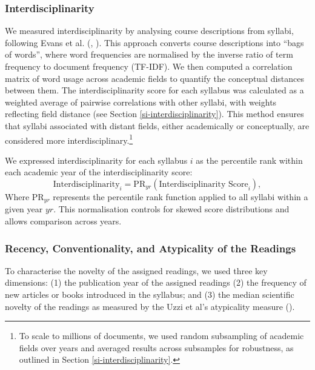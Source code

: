 \documentclass[
  11pt,
]{article}
\begin{document}
\subsubsection{Interdisciplinarity}\label{interdisciplinarity}

We measured interdisciplinarity by analysing course descriptions from syllabi, following Evans et al. (, ). This approach converts course descriptions into ``bags of words'', where word frequencies are normalised by the inverse ratio of term frequency to document frequency (TF-IDF). We then computed a correlation matrix of word usage across academic fields to quantify the conceptual distances between them. The interdisciplinarity score for each syllabus was calculated as a weighted average of pairwise correlations with other syllabi, with weights reflecting field distance (see Section \ref{si-interdisciplinarity}). This method ensures that syllabi associated with distant fields, either academically or conceptually, are considered more interdisciplinary.\footnote{
  To scale to millions of documents, we used random subsampling of academic fields over years and averaged results across subsamples for robustness, as outlined in Section \ref{si-interdisciplinarity}.}

We expressed interdisciplinarity for each syllabus \(i\) as the percentile rank within each academic year of the interdisciplinarity score:
\[
  \text{Interdisciplinarity}_i = \text{PR}_{yr} (\text{Interdisciplinarity Score}_i),
\]
Where \(\text{PR}_{yr}\) represents the percentile rank function applied to all syllabi within a given year \(yr\). This normalisation controls for skewed score distributions and allows comparison across years.

\subsubsection{Recency, Conventionality, and Atypicality of the Readings}\label{recency-conventionality-and-atypicality-of-the-readings}

To characterise the novelty of the assigned readings, we used three key dimensions: (1) the publication year of the assigned readings (2) the frequency of new articles or books introduced in the syllabus; and (3) the median scientific novelty of the readings as measured by the Uzzi et al's atypicality measure ().
\end{document}
